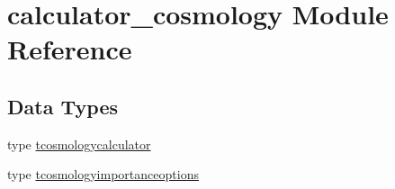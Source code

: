 \hypertarget{namespacecalculator__cosmology}{}\section{calculator\+\_\+cosmology Module Reference}
\label{namespacecalculator__cosmology}
\subsection*{Data Types}
\begin{DoxyCompactItemize}
\item 
type \mbox{\hyperlink{structcalculator__cosmology_1_1tcosmologycalculator}{tcosmologycalculator}}
\item 
type \mbox{\hyperlink{structcalculator__cosmology_1_1tcosmologyimportanceoptions}{tcosmologyimportanceoptions}}
\end{DoxyCompactItemize}

